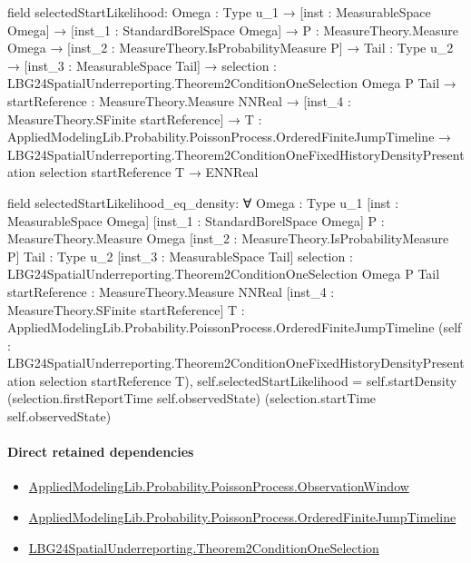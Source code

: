 \documentclass[10pt]{article}
\begin{document}
\begin{ReviewVerbatim}
field selectedStartLikelihood:
{Omega : Type u_1} →
  [inst : MeasurableSpace Omega] →
    [inst_1 : StandardBorelSpace Omega] →
      {P : MeasureTheory.Measure Omega} →
        [inst_2 : MeasureTheory.IsProbabilityMeasure P] →
          {Tail : Type u_2} →
            [inst_3 : MeasurableSpace Tail] →
              {selection : LBG24SpatialUnderreporting.Theorem2ConditionOneSelection Omega P Tail} →
                {startReference : MeasureTheory.Measure NNReal} →
                  [inst_4 : MeasureTheory.SFinite startReference] →
                    {T : AppliedModelingLib.Probability.PoissonProcess.OrderedFiniteJumpTimeline} →
                      LBG24SpatialUnderreporting.Theorem2ConditionOneFixedHistoryDensityPresentation selection
                          startReference T →
                        ENNReal

field selectedStartLikelihood_eq_density:
∀ {Omega : Type u_1} [inst : MeasurableSpace Omega] [inst_1 : StandardBorelSpace Omega]
  {P : MeasureTheory.Measure Omega} [inst_2 : MeasureTheory.IsProbabilityMeasure P] {Tail : Type u_2}
  [inst_3 : MeasurableSpace Tail] {selection : LBG24SpatialUnderreporting.Theorem2ConditionOneSelection Omega P Tail}
  {startReference : MeasureTheory.Measure NNReal} [inst_4 : MeasureTheory.SFinite startReference]
  {T : AppliedModelingLib.Probability.PoissonProcess.OrderedFiniteJumpTimeline}
  (self : LBG24SpatialUnderreporting.Theorem2ConditionOneFixedHistoryDensityPresentation selection startReference T),
  self.selectedStartLikelihood =
    self.startDensity (selection.firstReportTime self.observedState) (selection.startTime self.observedState)
\end{ReviewVerbatim}

\paragraph{Direct retained dependencies}
\begin{itemize}\raggedright
\item \hyperlink{governing-declaration-d7b8ba1fb1aa61f7}{Applied\allowbreak{}Modeling\allowbreak{}Lib.\allowbreak{}Probability.\allowbreak{}Poisson\allowbreak{}Process.\allowbreak{}Observation\allowbreak{}Window}
\item \hyperlink{governing-declaration-f690c3c90ba9b3a6}{Applied\allowbreak{}Modeling\allowbreak{}Lib.\allowbreak{}Probability.\allowbreak{}Poisson\allowbreak{}Process.\allowbreak{}Ordered\allowbreak{}Finite\allowbreak{}Jump\allowbreak{}Timeline}
\item \hyperlink{governing-declaration-b86695ea0bdc7438}{LBG24\allowbreak{}Spatial\allowbreak{}Underreporting.\allowbreak{}Theorem2\allowbreak{}Condition\allowbreak{}One\allowbreak{}Selection}
\end{itemize}
\end{document}
